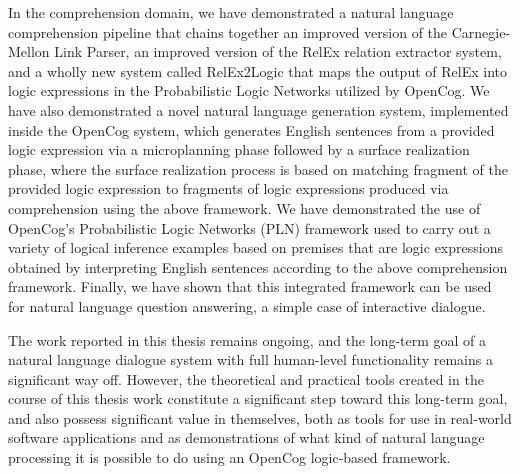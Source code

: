 \begin{englishabstract}
In the comprehension domain, we have demonstrated a natural language comprehension pipeline that chains together an improved version of the Carnegie-Mellon Link Parser, an improved version of the RelEx relation extractor system, and a wholly new system called RelEx2Logic that maps the output of RelEx into logic expressions in the Probabilistic Logic Networks utilized by OpenCog.    We have also demonstrated a novel natural language generation system, implemented inside the OpenCog system, which generates English sentences from a provided logic expression via a microplanning phase followed by a surface realization phase, where the surface realization process is based on matching fragment of the provided logic expression to fragments of logic expressions produced via comprehension using the above framework.   We have demonstrated the use of OpenCog's Probabilistic Logic Networks (PLN) framework used to carry out a variety of logical inference examples based on premises that are logic expressions obtained by interpreting English sentences according to the above comprehension framework.  Finally, we have shown that this integrated framework can be used for natural language question answering, a simple case of interactive dialogue.

The work reported in this thesis remains ongoing, and the long-term goal of a natural language dialogue system with full human-level functionality remains a significant way off.   However, the theoretical and practical tools created in the course of this thesis work constitute a significant step toward this long-term goal, and also possess significant value in themselves, both as tools for use in real-world software applications and as demonstrations of what kind of natural language processing it is possible to do using an OpenCog logic-based framework.

\end{englishabstract}
